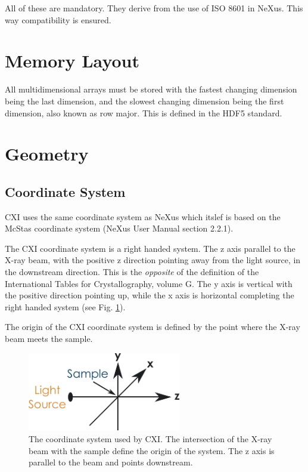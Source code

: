\documentclass[usletter,11pt]{article}
\begin{document}
All of these are mandatory.
They derive from the use of ISO 8601 in NeXus. This way compatibility is ensured.

\section{Memory Layout}
All multidimensional arrays must be stored with the fastest changing
dimension being the last dimension, and the slowest changing dimension
being the first dimension, also known as row major. This is defined in
the HDF5 standard.

\section{Geometry}
\subsection{Coordinate System}
CXI uses the same coordinate system as NeXus which itslef is 
based on the McStas coordinate system (NeXus User Manual section
2.2.1). 

The CXI coordinate system is a right handed system. The z axis
parallel to the X-ray beam, with the positive z direction pointing away
from the light source, in the downstream direction. This is the {\em
  opposite} of the definition of the International Tables for
Crystallography, volume G. The y axis is vertical with the positive
direction pointing up, while the x axis is horizontal completing the
right handed system (see Fig. \ref{fig:cxi_coord_system}).

The origin of the CXI coordinate system is defined by the point where the X-ray
beam meets the sample.

\begin{figure}[h!]
\centering
\includegraphics[width=0.6\textwidth]{coord_system.pdf}
\caption{The coordinate system used by CXI. The intersection of the
X-ray beam with the sample define the  origin of the system. The z
axis is parallel to the beam and
points downstream.}
\label{fig:cxi_coord_system}
\end{figure}
\end{document}
